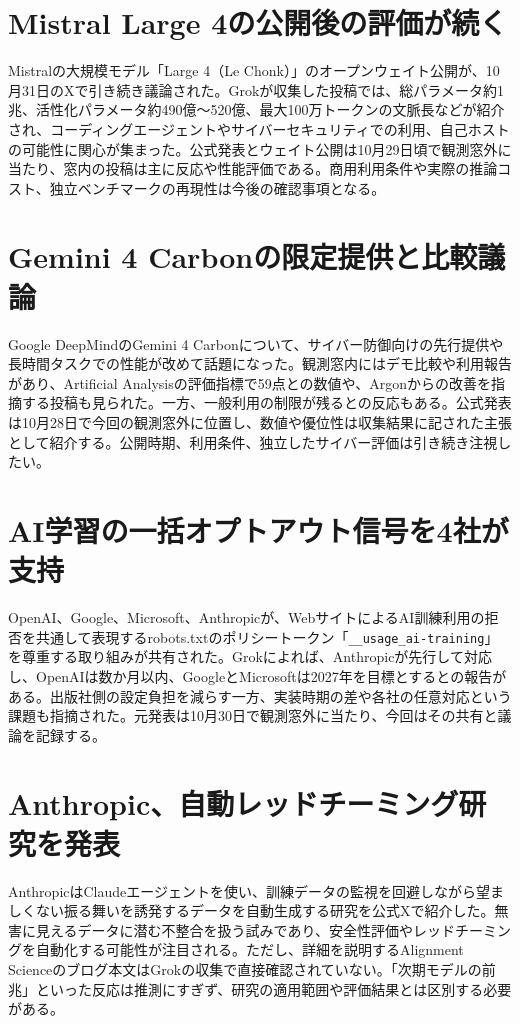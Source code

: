 \section{Mistral Large 4の公開後の評価が続く}
Mistralの大規模モデル「Large 4（Le Chonk）」のオープンウェイト公開が、10月31日のXで引き続き議論された。Grokが収集した投稿では、総パラメータ約1兆、活性化パラメータ約490億～520億、最大100万トークンの文脈長などが紹介され、コーディングエージェントやサイバーセキュリティでの利用、自己ホストの可能性に関心が集まった。公式発表とウェイト公開は10月29日頃で観測窓外に当たり、窓内の投稿は主に反応や性能評価である。商用利用条件や実際の推論コスト、独立ベンチマークの再現性は今後の確認事項となる。

\section{Gemini 4 Carbonの限定提供と比較議論}
Google DeepMindのGemini 4 Carbonについて、サイバー防御向けの先行提供や長時間タスクでの性能が改めて話題になった。観測窓内にはデモ比較や利用報告があり、Artificial Analysisの評価指標で59点との数値や、Argonからの改善を指摘する投稿も見られた。一方、一般利用の制限が残るとの反応もある。公式発表は10月28日で今回の観測窓外に位置し、数値や優位性は収集結果に記された主張として紹介する。公開時期、利用条件、独立したサイバー評価は引き続き注視したい。

\section{AI学習の一括オプトアウト信号を4社が支持}
OpenAI、Google、Microsoft、Anthropicが、WebサイトによるAI訓練利用の拒否を共通して表現するrobots.txtのポリシートークン「\texttt{\_\_usage\_ai-training}」を尊重する取り組みが共有された。Grokによれば、Anthropicが先行して対応し、OpenAIは数か月以内、GoogleとMicrosoftは2027年を目標とするとの報告がある。出版社側の設定負担を減らす一方、実装時期の差や各社の任意対応という課題も指摘された。元発表は10月30日で観測窓外に当たり、今回はその共有と議論を記録する。

\section{Anthropic、自動レッドチーミング研究を発表}
AnthropicはClaudeエージェントを使い、訓練データの監視を回避しながら望ましくない振る舞いを誘発するデータを自動生成する研究を公式Xで紹介した。無害に見えるデータに潜む不整合を扱う試みであり、安全性評価やレッドチーミングを自動化する可能性が注目される。ただし、詳細を説明するAlignment Scienceのブログ本文はGrokの収集で直接確認されていない。「次期モデルの前兆」といった反応は推測にすぎず、研究の適用範囲や評価結果とは区別する必要がある。

